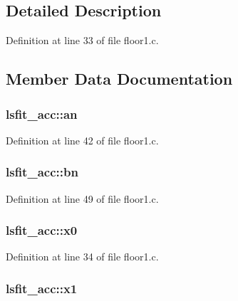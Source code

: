 \subsection{Detailed Description}


Definition at line 33 of file floor1.\+c.



\subsection{Member Data Documentation}
\subsubsection[{\texorpdfstring{an}{an}}]{ lsfit\+\_\+acc\+::an}\hypertarget{structlsfit__acc_ad21459eeaddd7da027130b622e02bad9}{}\label{structlsfit__acc_ad21459eeaddd7da027130b622e02bad9}


Definition at line 42 of file floor1.\+c.

\subsubsection[{\texorpdfstring{bn}{bn}}]{ lsfit\+\_\+acc\+::bn}\hypertarget{structlsfit__acc_a5b0d1e6a5f5096c5c3bdfd3a516993f2}{}\label{structlsfit__acc_a5b0d1e6a5f5096c5c3bdfd3a516993f2}


Definition at line 49 of file floor1.\+c.

\subsubsection[{\texorpdfstring{x0}{x0}}]{ lsfit\+\_\+acc\+::x0}\hypertarget{structlsfit__acc_a74726b2c76f9e7ccd8f7c70b24e679e2}{}\label{structlsfit__acc_a74726b2c76f9e7ccd8f7c70b24e679e2}


Definition at line 34 of file floor1.\+c.

\subsubsection[{\texorpdfstring{x1}{x1}}]{ lsfit\+\_\+acc\+::x1}\hypertarget{structlsfit__acc_a81222dea0374164b72030f27b3fc0eb3}{}\label{structlsfit__acc_a81222dea0374164b72030f27b3fc0eb3}



